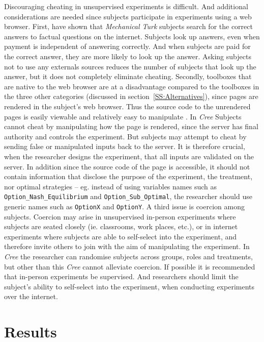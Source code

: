 \documentclass[preprint, 12pt]{elsarticle}
\newcommand{\Cree}{\emph{Cree}\xspace}
\begin{document}
Discouraging cheating in unsupervised experiments is difficult. And additional considerations are needed since subjects participate in experiments using a web browser. First, \cite{Goodman_Cryder_Cheema_2013} have shown that \emph{Mechanical Turk} subjects search for the correct answers to factual questions on the internet. Subjects look up answers, even when payment is independent of answering correctly. And when subjects are paid for the correct answer, they are more likely to look up the answer. Asking subjects not to use any externals sources reduces the number of subjects that look up the answer, but it does not completely eliminate cheating. Secondly, toolboxes that are native to the web browser are at a disadvantage compared to the toolboxes in the three other categories (discussed in section~\ref{SS:Alternatives}), since pages are rendered in the subject's web browser. Thus the source code to the unrendered pages is easily viewable and relatively easy to manipulate \citep[25m. 12s.]{Hawkes_2011}. In \Cree Subjects cannot cheat by manipulating how the page is rendered, since the server has final authority and controls the experiment. But subjects may attempt to cheat by sending false or manipulated inputs back to the server. It is therefore crucial, when the researcher designs the experiment, that all inputs are validated on the server. In addition since the source code of the page is accessible, it should not contain information that disclose the purpose of the experiment, the treatment, nor optimal strategies -- eg. instead of using variables names such as \texttt{Option\_Nash\_Equilibrium} and \texttt{Option\_Sub\_Optimal}, the researcher should use generic names such as \texttt{OptionX} and \texttt{OptionY}. A third issue is coercion among subjects. Coercion may arise in unsupervised in-person experiments where subjects are seated closely (ie. classrooms, work places, etc.), or in internet experiments where subjects are able to self-select into the experiment, and therefore invite others to join with the aim of manipulating the experiment. In \Cree the researcher can randomise subjects across groups, roles and treatments, but other than this \Cree cannot alleviate coercion. If possible it is recommended that in-person experiments be supervised. And researchers should limit the subject's ability to self-select into the experiment, when conducting experiments over the internet. 


\section{Results}
\label{S:Results}
\end{document}
